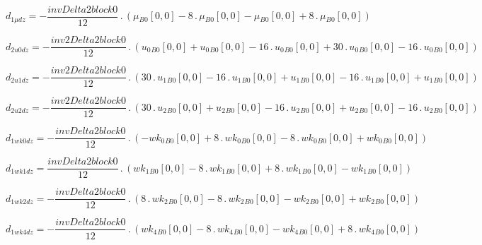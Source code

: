 \documentclass{article}
\begin{document}
\begin{dmath}d_{1 \mu dz} = - \frac{invDelta2block0}{12} \,.\, \left({\mu{_{B0}}}[{0,0}] - 8 \,.\, {\mu{_{B0}}}[{0,0}] - {\mu{_{B0}}}[{0,0}] + 8 \,.\, {\mu{_{B0}}}[{0,0}]\right)\end{dmath}

\begin{dmath}d_{2 u0 dz} = - \frac{inv2Delta2block0}{12} \,.\, \left({u_{0}{_{B0}}}[{0,0}] + {u_{0}{_{B0}}}[{0,0}] - 16 \,.\, {u_{0}{_{B0}}}[{0,0}] + 30 \,.\, {u_{0}{_{B0}}}[{0,0}] - 16 \,.\, {u_{0}{_{B0}}}[{0,0}]\right)\end{dmath}

\begin{dmath}d_{2 u1 dz} = - \frac{inv2Delta2block0}{12} \,.\, \left(30 \,.\, {u_{1}{_{B0}}}[{0,0}] - 16 \,.\, {u_{1}{_{B0}}}[{0,0}] + {u_{1}{_{B0}}}[{0,0}] - 16 \,.\, {u_{1}{_{B0}}}[{0,0}] + {u_{1}{_{B0}}}[{0,0}]\right)\end{dmath}

\begin{dmath}d_{2 u2 dz} = - \frac{inv2Delta2block0}{12} \,.\, \left(30 \,.\, {u_{2}{_{B0}}}[{0,0}] + {u_{2}{_{B0}}}[{0,0}] - 16 \,.\, {u_{2}{_{B0}}}[{0,0}] + {u_{2}{_{B0}}}[{0,0}] - 16 \,.\, {u_{2}{_{B0}}}[{0,0}]\right)\end{dmath}

\begin{dmath}d_{1 wk0 dz} = - \frac{invDelta2block0}{12} \,.\, \left(- {wk_{0}{_{B0}}}[{0,0}] + 8 \,.\, {wk_{0}{_{B0}}}[{0,0}] - 8 \,.\, {wk_{0}{_{B0}}}[{0,0}] + {wk_{0}{_{B0}}}[{0,0}]\right)\end{dmath}

\begin{dmath}d_{1 wk1 dz} = \frac{invDelta2block0}{12} \,.\, \left({wk_{1}{_{B0}}}[{0,0}] - 8 \,.\, {wk_{1}{_{B0}}}[{0,0}] + 8 \,.\, {wk_{1}{_{B0}}}[{0,0}] - {wk_{1}{_{B0}}}[{0,0}]\right)\end{dmath}

\begin{dmath}d_{1 wk2 dz} = - \frac{invDelta2block0}{12} \,.\, \left(8 \,.\, {wk_{2}{_{B0}}}[{0,0}] - 8 \,.\, {wk_{2}{_{B0}}}[{0,0}] - {wk_{2}{_{B0}}}[{0,0}] + {wk_{2}{_{B0}}}[{0,0}]\right)\end{dmath}

\begin{dmath}d_{1 wk4 dz} = - \frac{invDelta2block0}{12} \,.\, \left({wk_{4}{_{B0}}}[{0,0}] - 8 \,.\, {wk_{4}{_{B0}}}[{0,0}] - {wk_{4}{_{B0}}}[{0,0}] + 8 \,.\, {wk_{4}{_{B0}}}[{0,0}]\right)\end{dmath}
\end{document}
